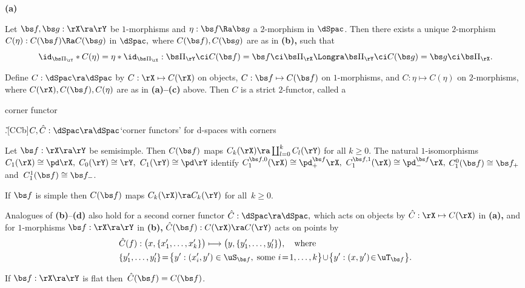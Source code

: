 \documentclass{article}
\begin{document}
\begin{thm}{\bf(a)}
\smallskip

 Let\/ $\bs f,\bs g:\rX\ra\rY$ be $1$-morphisms
and\/ $\eta:\bs f\Ra\bs g$ a $2$-morphism in $\dSpac$. Then there
exists a unique $2$-morphism $C(\eta):C(\bs f)\Ra C(\bs g)$ in
$\dSpac,$ where $C(\bs f),C(\bs g)$ are as in {\bf(b)\rm,} such that
\begin{equation*}
\id_{\bs\Pi_\rY}*C(\eta)=\eta*\id_{\bs\Pi_\rX}:\bs\Pi_\rY\ci C(\bs f)
=\bs f\ci\bs\Pi_\rX\Longra\bs\Pi_\rY\ci C(\bs g)=\bs
g\ci\bs\Pi_\rX.
\end{equation*}

 Define $C:\dSpac\ra\dSpac$ by $C:\rX\mapsto
C(\rX)$ on objects, $C:\bs f\mapsto C(\bs f)$ on\/ $1$-morphisms,
and\/ $C:\eta\mapsto C(\eta)$ on\/ $2$-morphisms, where
$C(\rX),C(\bs f), C(\eta)$ are as in {\bf(a)--(c)} above. Then $C$
is a strict\/ $2$-functor, called a
\begin{bfseries}corner functor\end{bfseries}.\G[CCb]{$C,\hat
C:\dSpac\ra\dSpac$}{`corner functors' for d-spaces with corners}

\smallskip

 Let\/ $\bs f:\rX\ra\rY$ be semisimple. Then $C(\bs
f)$ maps $C_k(\rX)\ra\coprod_{l=0}^kC_l(\rY)$ for all\/ $k\ge 0$.
The natural\/ $1$-isomorphisms $C_1(\rX)\cong\pd\rX,$
$C_0(\rY)\cong\rY,$ $C_1(\rY)\cong\pd\rY$ identify $C_1^{\bs
f,0}(\rX)\cong\pd^{\bs f}_+\rX,$ $C_1^{\bs f,1}(\rX)\cong\pd^{\bs
f}_-\rX,$ $C_1^0(\bs f)\cong\bs f_+$ and\/~$C_1^1(\bs f)\cong\bs
f_-$.

If\/ $\bs f$ is simple then $C(\bs f)$ maps $C_k(\rX)\ra C_k(\rY)$
for all\/~$k\ge 0$.
\smallskip

 Analogues of\/ {\bf(b)}--{\bf(d)} also hold for a
second corner functor\/ $\hat C:\dSpac\ra\dSpac,$ which acts on
objects by $\hat C:\rX\mapsto C(\rX)$ in {\bf(a)\rm,} and for
$1$-morphisms $\bs f:\rX\ra\rY$ in {\bf(b)\rm,} $\hat C(\bs
f):C(\rX)\ra C(\rY)$ acts on points by
\begin{align*}
&\hat C(f):\bigl(x,\{x_1',\ldots,x_k'\}\bigr)\longmapsto
\bigl(y,\{y_1',\ldots,y_l'\}\bigr),\quad\text{where}\\
&\{y_1',\ldots,y_l'\}\!=\!\bigl\{y':(x_i',y')\in\uS_{\bs f},\;
\text{some $i\!=\!1,\ldots,k$}\bigr\}\!\cup\!\bigl\{y':(x,y')\!\in
\!\uT_{\bs f}\bigr\}.
\end{align*}

If\/ $\bs f:\rX\ra\rY$ is flat then\/~$\hat C(\bs f)=C(\bs f)$.
\label{ds6thm3}
\end{thm}
\end{document}
